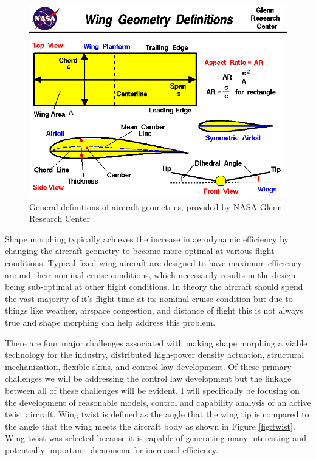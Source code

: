 \documentclass[11pt]{ucthesis}
\begin{document}
\begin{figure}[h]
\centering
\includegraphics[width=0.75\linewidth]{./Figures/AircraftGeom.png}
\caption{General definitions of aircraft geometries, provided by NASA Glenn Research Center}
\label{fig:airGeo}
\end{figure}

Shape morphing typically achieves the increase in aerodynamic efficiency by changing the aircraft geometry to become more optimal at various flight conditions. Typical fixed wing aircraft are designed to have maximum efficiency around their nominal cruise conditions, which necessarily results in the design being sub-optimal at other flight conditions. In theory the aircraft should spend the vast majority of it's flight time at its nominal cruise condition but due to things like weather, airspace congestion, and distance of flight this is not always true and shape morphing can help address this problem.  

There are four major challenges associated with making shape morphing a viable technology for the industry, distributed high-power density actuation, structural mechanization, flexible skins, and control law development. \cite{reich2007introduction} Of these primary challenges we will be addressing the control law development but the linkage between all of these challenges will be evident. I will specifically be focusing on the development of reasonable models, control and capability analysis of an active twist aircraft. Wing twist is defined as the angle that the wing tip is compared to the angle that the wing meets the aircraft body as shown in Figure \ref{fig:twist}. Wing twist was selected because it is capable of generating many interesting and potentially important phenomena for increased efficiency.
\end{document}
